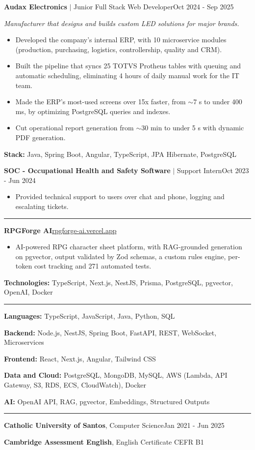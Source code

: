\documentclass[letterpaper,10pt]{article}
\newcommand{\cvsection}[1]{%
  \vspace{9pt}{\large\bfseries #1}\par\vspace{-5pt}%
  \rule{\linewidth}{0.4pt}\par\vspace{1pt}}
\newcommand{\cvheading}[3]{\textbf{#1} $|$ #2\hfill #3\par}
\newenvironment{cvitems}
  {\begin{itemize}[leftmargin=0.16in,label={},itemsep=1.5pt,topsep=2pt,parsep=0pt]}
  {\end{itemize}}
\newcommand{\cvstack}[2]{\vspace{2pt}\textbf{#1:} #2\par}
\begin{document}
\vspace{7pt}
\cvheading{Audax Electronics}{Junior Full Stack Web Developer}{Oct 2024 - Sep 2025}
\textit{Manufacturer that designs and builds custom LED solutions for major brands.}\par
\begin{cvitems}
  \item Developed the company's internal ERP, with 10 microservice modules (production,
        purchasing, logistics, controllership, quality and CRM).
  \item Built the pipeline that syncs 25 TOTVS Protheus tables with queuing and automatic
        scheduling, eliminating 4 hours of daily manual work for the IT team.
  \item Made the ERP's most-used screens over 15x faster, from $\sim$7 s to under 400 ms, by
        optimizing PostgreSQL queries and indexes.
  \item Cut operational report generation from $\sim$30 min to under 5 s with dynamic PDF
        generation.
\end{cvitems}
\cvstack{Stack}{Java, Spring Boot, Angular, TypeScript, JPA Hibernate, PostgreSQL}

\vspace{7pt}
\cvheading{SOC - Occupational Health and Safety Software}{Support Intern}{Oct 2023 - Jun 2024}
\begin{cvitems}
  \item Provided technical support to users over chat and phone, logging and escalating tickets.
\end{cvitems}

\cvsection{Projects}
\textbf{RPGForge AI}\hfill\href{https://rpgforge-ai.vercel.app}{rpgforge-ai.vercel.app}\par
\begin{cvitems}
  \item AI-powered RPG character sheet platform, with RAG-grounded generation on pgvector, output
        validated by Zod schemas, a custom rules engine, per-token cost tracking and 271
        automated tests.
\end{cvitems}
\cvstack{Technologies}{TypeScript, Next.js, NestJS, Prisma, PostgreSQL, pgvector, OpenAI, Docker}

\cvsection{Skills}
\textbf{Languages:} TypeScript, JavaScript, Java, Python, SQL\par
\textbf{Backend:} Node.js, NestJS, Spring Boot, FastAPI, REST, WebSocket, Microservices\par
\textbf{Frontend:} React, Next.js, Angular, Tailwind CSS\par
\textbf{Data and Cloud:} PostgreSQL, MongoDB, MySQL, AWS (Lambda, API Gateway, S3, RDS, ECS, CloudWatch), Docker\par
\textbf{AI:} OpenAI API, RAG, pgvector, Embeddings, Structured Outputs\par

\cvsection{Education and Languages}
\textbf{Catholic University of Santos}, Computer Science\hfill Jan 2021 - Jun 2025\par
\textbf{Cambridge Assessment English}, English Certificate CEFR B1\par
\end{document}
